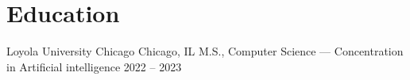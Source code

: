 \section*{Education}

\cventry
    {Loyola University Chicago}
    {Chicago, IL}
    {M.S., Computer Science --- Concentration in Artificial intelligence}
    {2022 -- 2023}